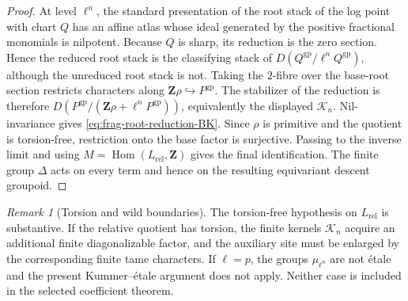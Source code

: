 \documentclass[11pt]{article}
\theoremstyle{definition}
\theoremstyle{remark}
\newtheorem{remark}[theorem]{Remark}
\begin{document}
\begin{proof}
At level $\ell^n$, the standard presentation of the root stack of the log
point with chart $Q$ has an affine atlas whose ideal generated by the positive
fractional monomials is nilpotent.  Because $Q$ is sharp, its reduction is the
zero section.  Hence the reduced root stack is the classifying stack of
\(D(Q^{\mathrm{gp}}/\ell^nQ^{\mathrm{gp}})\), although the unreduced root
stack is not.  Taking the $2$-fibre over the base-root section restricts
characters along
\(\mathbf Z\rho\hookrightarrow P^{\mathrm{gp}}\).  The stabilizer of the
reduction is therefore
\(D(P^{\mathrm{gp}}/(\mathbf Z\rho+\ell^nP^{\mathrm{gp}}))\), equivalently
the displayed $\mathcal K_n$.  Nil-invariance gives
\eqref{eq:frag-root-reduction-BK}.  Since $\rho$ is primitive and the quotient
is torsion-free, restriction onto the base factor is surjective.  Passing to
the inverse limit and using
\(M=\operatorname{Hom}(L_{\mathrm{rel}},\mathbf Z)\) gives the final
identification.  The finite group $\Delta$ acts on every term and hence on
the resulting equivariant descent groupoid.
\end{proof}

\begin{remark}[Torsion and wild boundaries]
The torsion-free hypothesis on $L_{\mathrm{rel}}$ is substantive.  If the
relative quotient has torsion, the finite kernels $\mathcal K_n$ acquire an additional
finite diagonalizable factor, and the auxiliary site must be enlarged by the
corresponding finite tame characters.  If $\ell=p$, the groups
$\mu_{\ell^n}$ are not \'{e}tale and the present Kummer--\'{e}tale argument
does not apply.  Neither case is included in the selected coefficient theorem.
\end{remark}
\end{document}
